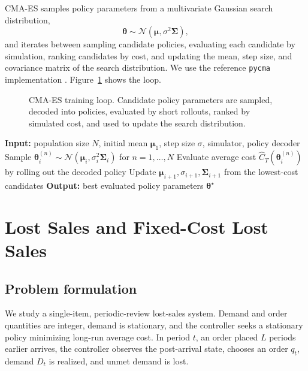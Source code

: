 \documentclass[authoryear,11pt]{elsarticle}
\newcommand{\btheta}{\boldsymbol{\theta}}
\newcommand{\bmu}{\boldsymbol{\mu}}
\newcommand{\bSigma}{\boldsymbol{\Sigma}}
\begin{document}
CMA-ES samples policy parameters from a multivariate Gaussian search distribution,
\[
\btheta\sim \mathcal{N}(\bmu,\sigma^2\bSigma),
\]
and iterates between sampling candidate policies, evaluating each candidate by simulation, ranking candidates by cost, and updating the mean, step size, and covariance matrix of the search distribution. We use the reference \texttt{pycma} implementation \citep{Hansen2019pycma}. Figure~\ref{fig:cma_loop} shows the loop.

\begin{figure}[H]
\centering
\CMAESLoopFigure
\caption{CMA-ES training loop. Candidate policy parameters are sampled, decoded into policies, evaluated by short rollouts, ranked by simulated cost, and used to update the search distribution.}
\label{fig:cma_loop}
\end{figure}

\begin{algorithm}[!htbp]
\caption{CMA-ES policy optimization}
\label{alg:cmaes-framework}
\begin{algorithmic}[1]
    \STATE \textbf{Input:} population size $N$, initial mean $\bmu_1$, step size $\sigma$, simulator, policy decoder
        \STATE Sample $\btheta^{(n)}_i\sim\mathcal{N}(\bmu_i,\sigma_i^2\bSigma_i)$ for $n=1,\dots,N$
        \STATE Evaluate average cost $\hat C_T(\btheta^{(n)}_i)$ by rolling out the decoded policy
        \STATE Update $\bmu_{i+1},\sigma_{i+1},\bSigma_{i+1}$ from the lowest-cost candidates
    \ENDFOR
    \STATE \textbf{Output:} best evaluated policy parameters $\btheta^\star$
\end{algorithmic}
\end{algorithm}

\section{Lost Sales and Fixed-Cost Lost Sales}
\label{sec:lost_sales}

\subsection{Problem formulation}

We study a single-item, periodic-review lost-sales system. Demand and order quantities are integer, demand is stationary, and the controller seeks a stationary policy minimizing long-run average cost. In period $t$, an order placed $L$ periods earlier arrives, the controller observes the post-arrival state, chooses an order $q_t$, demand $D_t$ is realized, and unmet demand is lost.
\end{document}
